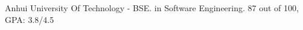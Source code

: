 

\begin{scholarship}
					{Anhui University Of Technology  - BSE. in Software Engineering.}
					{87 out of 100, GPA: 3.8/4.5}
\emptySeparator

\end{scholarship}